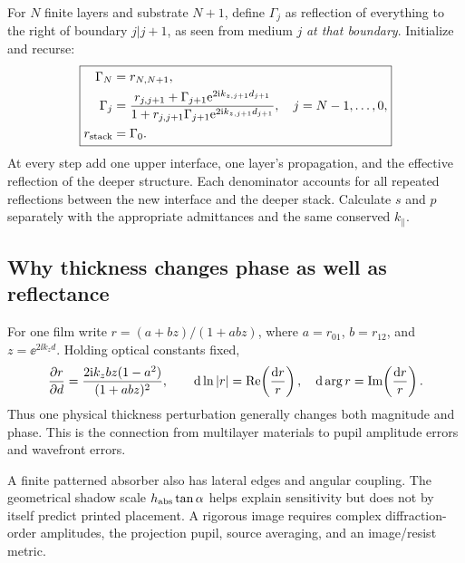 For $N$ finite layers and substrate $N+1$, define $\Gamma_j$ as reflection of everything to the right of boundary $j|j+1$, as seen from medium $j$ \emph{at that boundary}. Initialize and recurse:
\begin{equation}
\boxed{\begin{aligned}
\Gamma_N&=r_{N,N+1},\\
\Gamma_j&=\frac{r_{j,j+1}+\Gamma_{j+1}\mathrm{e}^{2\mathrm{i} k_{z,j+1}d_{j+1}}}
{1+r_{j,j+1}\Gamma_{j+1}\mathrm{e}^{2\mathrm{i} k_{z,j+1}d_{j+1}}},
\quad j=N-1,\ldots,0,\\
r_{\rm stack}&=\Gamma_0.
\end{aligned}}
\label{eq:stack}
\end{equation}
At every step add one upper interface, one layer's propagation, and the effective reflection of the deeper structure. Each denominator accounts for all repeated reflections between the new interface and the deeper stack. Calculate $s$ and $p$ separately with the appropriate admittances and the same conserved $k_\parallel$.

\subsection{Why thickness changes phase as well as reflectance}
For one film write $r=(a+bz)/(1+abz)$, where $a=r_{01}$, $b=r_{12}$, and $z=\ee^{2\ii k_zd}$. Holding optical constants fixed,
\begin{equation}
\frac{\partial r}{\partial d}
=\frac{2\mathrm{i} k_zbz(1-a^2)}{(1+abz)^2},\qquad
\mathrm{d}\ln|r|=\operatorname{Re}\!\left(\frac{\mathrm{d} r}{r}\right),\quad
\mathrm{d}\arg r=\operatorname{Im}\!\left(\frac{\mathrm{d} r}{r}\right).
\end{equation}
Thus one physical thickness perturbation generally changes both magnitude and phase. This is the connection from multilayer materials to pupil amplitude errors and wavefront errors.


A finite patterned absorber also has lateral edges and angular coupling. The geometrical shadow scale $h_{\rm abs}\tan\alpha$ helps explain sensitivity but does not by itself predict printed placement. A rigorous image requires complex diffraction-order amplitudes, the projection pupil, source averaging, and an image/resist metric.
\clearpage
